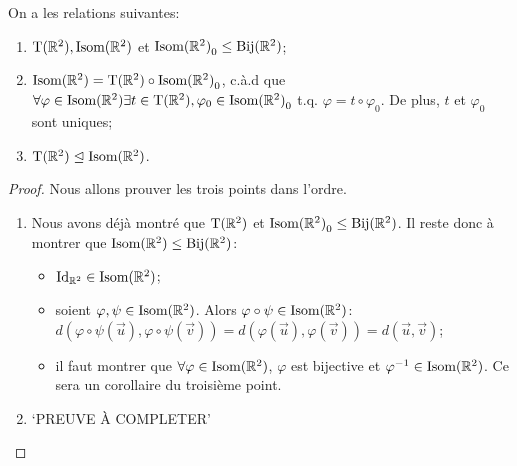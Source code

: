 \documentclass{book}
\numberwithin{equation}{section}
\renewcommand{\phi}{\varphi}
\providecommand{\plan}{{\mathbb R^2}}
\providecommand{\id}{{\textnormal{Id}}}
\providecommand{\IdR}{{\id_\plan}}
\providecommand{\transR}{{\textnormal{T}(\plan)}}
\providecommand{\isom}{{\textnormal{Isom}(\plan)}}
\providecommand{\isomo}{{\isom_0}}
\providecommand{\bij}[1]{{\textnormal{Bij}(#1)}}
\providecommand{\bijR}{{\bij{\plan}}}
\providecommand{\subgroupeq}{\leq}
\providecommand{\subgroupnormaleq}{\trianglelefteq}
\begin{document}
\begin{thm}
	On a les relations suivantes:
	\begin{enumerate}
		\item $\transR, \isom$ et $\isomo \subgroupeq \bijR$;
		\item $\isom = \transR \circ \isomo$, c.à.d que $\forall \phi \in \isom \exists t \in \transR, \phi_0 \in \isomo$ t.q. $\phi = t \circ \phi_0$. De plus, $t$ et $\phi_0$ sont uniques;
		\item $\transR \subgroupnormaleq \isom$.
	\end{enumerate}
\end{thm}

\begin{proof}
	Nous allons prouver les trois points dans l'ordre.
	\begin{enumerate}
		\item Nous avons déjà montré que $\transR$ et $\isomo \subgroupeq \bijR$. Il reste donc à montrer que $\isom \subgroupeq \bijR$:
		\begin{itemize}
			\item $\IdR \in \isom$;
			\item soient $\phi, \psi \in \isom$. Alors $\phi \circ \psi \in \isom$: $d(\phi \circ \psi(\vec u), \phi \circ \psi(\vec v)) = d(\phi(\vec u), \phi(\vec v)) = d(\vec u, \vec v)$;
			\item il faut montrer que $\forall \phi \in \isom$, $\phi$ est bijective et $\phi^{-1} \in \isom$. Ce sera un corollaire du troisième point.
		\end{itemize}
		
		\item `PREUVE À COMPLETER'
		

\end{enumerate}
\end{proof}
\end{document}

